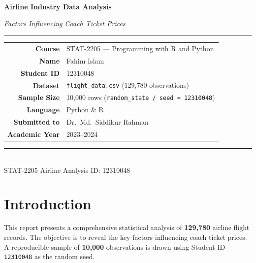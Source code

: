 \documentclass[12pt, a4paper]{report}
\newcommand{\stat}[1]{\textbf{\textcolor{themeAccent}{#1}}}
\begin{document}
\begin{titlepage}
  \pagecolor{themeBlue}
  \color{white}
  \centering
  \vspace*{2cm}

  {\Huge\bfseries Airline Industry Data Analysis\par}
  \vspace{0.4cm}
  {\large\itshape Factors Influencing Coach Ticket Prices\par}
  \vspace{1.5cm}
  \color{themeAccent}
  \rule{0.6\linewidth}{1pt}
  \vspace{1cm}
  \color{white}

  \begin{tabular}{rl}
    \textbf{Course}      & STAT-2205 — Programming with R and Python \\[4pt]
    \textbf{Name}        & Fahim Islam \\[4pt]
    \textbf{Student ID}  & 12310048 \\[4pt]
    \textbf{Dataset}     & \texttt{flight\_data.csv} (129,780 observations) \\[4pt]
    \textbf{Sample Size} & 10,000 rows (\texttt{random\_state / seed = 12310048}) \\[4pt]
    \textbf{Language}    & Python \& R \\[4pt]
    \textbf{Submitted to}& Dr.\ Md.\ Siddikur Rahman \\[4pt]
    \textbf{Academic Year}& 2023--2024 \\
  \end{tabular}

  \vfill
  \color{themeAccent}
  \rule{0.6\linewidth}{1pt}
  \vspace{0.5cm}\\
  \color{white}
  {\small STAT-2205 \textbar{} Airline Analysis \textbar{} ID: 12310048}
\end{titlepage}
\pagecolor{white}\color{black}

\tableofcontents
\newpage

\chapter{Introduction}

This report presents a comprehensive statistical analysis of \stat{129,780} airline flight records. The objective is to reveal the key factors influencing coach ticket prices. A reproducible sample of \stat{10,000} observations is drawn using Student ID \texttt{12310048} as the random seed.
\end{document}
